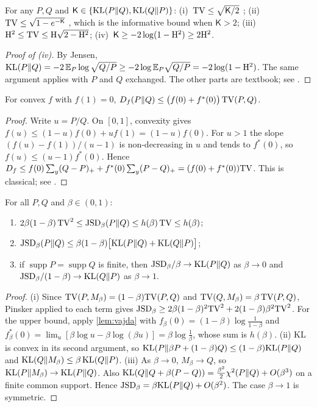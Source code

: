 \begin{proposition}\label{prop:pinsker}
\Kn For any $P,Q$ and $\mathsf K\in\{\mathrm{KL}(P\|Q),\mathrm{KL}(Q\|P)\}$:
(i)~$\mathrm{TV}\le\sqrt{\mathsf K/2}$ \citep{pinsker1964information,tsybakov2009introduction};
(ii)~$\mathrm{TV}\le\sqrt{1-e^{-\mathsf K}}$ \citep{bretagnolle1979estimation}, which is the informative bound when
$\mathsf K>2$;
(iii)~$\mathrm{H}^2\le\mathrm{TV}\le\mathrm{H}\sqrt{2-\mathrm{H}^2}$;
(iv)~$\mathsf K\ge-2\log(1-\mathrm{H}^2)\ge2\mathrm{H}^2$.
\end{proposition}
\begin{proof}[Proof of (iv)]
By Jensen, $\mathrm{KL}(P\|Q)=-2\,\mathbb{E}_P\log\sqrt{Q/P}\ge-2\log\mathbb{E}_P\sqrt{Q/P}=-2\log(1-\mathrm{H}^2)$. The same argument
applies with $P$ and $Q$ exchanged. The other parts are textbook; see \citet[Lemmas~2.3--2.6]{tsybakov2009introduction}.
\end{proof}

\begin{lemma}\label{lem:vajda}
\Pv For convex $f$ with $f(1)=0$, $D_f(P\|Q)\le\big(f(0)+f^*(0)\big)\,\mathrm{TV}(P,Q)$.
\end{lemma}
\begin{proof}
Write $u=P/Q$. On $[0,1]$, convexity gives $f(u)\le(1-u)f(0)+uf(1)=(1-u)f(0)$. For $u>1$ the slope
$(f(u)-f(1))/(u-1)$ is non-decreasing in $u$ and tends to $f^*(0)$, so $f(u)\le(u-1)f^*(0)$. Hence
$D_f\le f(0)\sum_y(Q-P)_++f^*(0)\sum_y(P-Q)_+=(f(0)+f^*(0))\mathrm{TV}$. This is classical; see
\citet{sason2016fdivergence}.
\end{proof}

\begin{proposition}\label{prop:jsd}
\Pv\Ck For all $P,Q$ and $\beta\in(0,1)$:
\begin{enumerate}[label=(\roman*),nosep]
\item $2\beta(1-\beta)\,\mathrm{TV}^2\le\mathrm{JSD}_\beta(P\|Q)\le h(\beta)\,\mathrm{TV}\le h(\beta)$;
\item $\mathrm{JSD}_\beta(P\|Q)\le\beta(1-\beta)\big[\mathrm{KL}(P\|Q)+\mathrm{KL}(Q\|P)\big]$;
\item if $\operatorname{supp}P=\operatorname{supp}Q$ is finite, then
$\mathrm{JSD}_\beta/\beta\to\mathrm{KL}(P\|Q)$ as $\beta\to0$ and $\mathrm{JSD}_\beta/(1-\beta)\to\mathrm{KL}(Q\|P)$ as $\beta\to1$.
\end{enumerate}
\end{proposition}
\begin{proof}
(i) Since $\mathrm{TV}(P,M_\beta)=(1-\beta)\mathrm{TV}(P,Q)$ and $\mathrm{TV}(Q,M_\beta)=\beta\,\mathrm{TV}(P,Q)$, Pinsker applied to each
term gives $\mathrm{JSD}_\beta\ge2\beta(1-\beta)^2\mathrm{TV}^2+2(1-\beta)\beta^2\mathrm{TV}^2$. For the upper bound, apply
\cref{lem:vajda} with $f_\beta(0)=(1-\beta)\log\frac1{1-\beta}$ and
$f_\beta^*(0)=\lim_u[\beta\log u-\beta\log(\beta u)]=\beta\log\frac1\beta$, whose sum is $h(\beta)$.
(ii) KL is convex in its second argument, so $\mathrm{KL}(P\|\beta P+(1-\beta)Q)\le(1-\beta)\mathrm{KL}(P\|Q)$ and
$\mathrm{KL}(Q\|M_\beta)\le\beta\,\mathrm{KL}(Q\|P)$.
(iii) As $\beta\to0$, $M_\beta\to Q$, so $\mathrm{KL}(P\|M_\beta)\to\mathrm{KL}(P\|Q)$. Also
$\mathrm{KL}(Q\|Q+\beta(P-Q))=\frac{\beta^2}2\chi^2(P\|Q)+O(\beta^3)$ on a finite common support. Hence
$\mathrm{JSD}_\beta=\beta\mathrm{KL}(P\|Q)+O(\beta^2)$. The case $\beta\to1$ is symmetric.
\end{proof}

